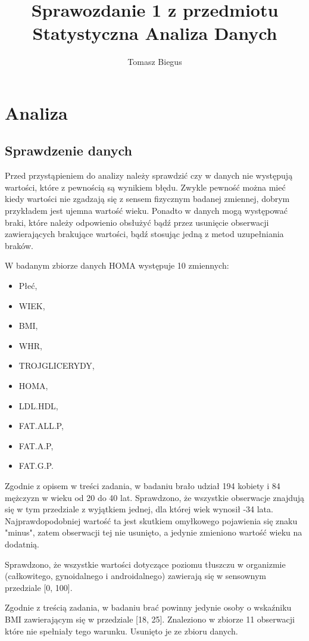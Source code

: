 \documentclass{article}
\author{Tomasz Biegus}
\title{Sprawozdanie 1 z przedmiotu Statystyczna Analiza Danych}
\begin{document}
\maketitle



\section{Analiza}
\subsection{Sprawdzenie danych}
Przed przystąpieniem do analizy należy sprawdzić czy w danych nie występują wartości, które z pewnością są wynikiem błędu. Zwykle pewność można mieć kiedy wartości nie zgadzają się z sensem fizycznym badanej zmiennej, dobrym przykładem jest ujemna wartość wieku. Ponadto w danych mogą występować braki, które należy odpowienio obsłużyć bądź przez usunięcie obserwacji zawierających brakujące wartości, bądź stosując jedną z metod uzupełniania braków.

W badanym zbiorze danych HOMA występuje 10 zmiennych: 
\begin{itemize}
\item Płeć, 
\item WIEK, 
\item BMI, 
\item WHR, 
\item TROJGLICERYDY, 
\item HOMA, 
\item LDL.HDL, 
\item FAT.ALL.P, 
\item FAT.A.P, 
\item FAT.G.P.
\end{itemize}


Zgodnie z opisem w treści zadania, w badaniu brało udział 194 kobiety i 84 mężczyzn w wieku od 20 do 40 lat. Sprawdzono, że wszystkie obserwacje znajdują się w tym przedziale z wyjątkiem jednej, dla której wiek wynosił -34 lata. Najprawdopodobniej wartość ta jest skutkiem omyłkowego pojawienia się znaku "minus", zatem obserwacji tej nie usunięto, a jedynie zmieniono wartość wieku na dodatnią.

Sprawdzono, że wszystkie wartości dotyczące poziomu tłuszczu w organizmie (całkowitego, gynoidalnego i androidalnego) zawierają się w sensownym przedziale [0, 100].

Zgodnie z treścią zadania, w badaniu brać powinny jedynie osoby o wskaźniku BMI zawierającym się w przedziale [18, 25]. Znaleziono w zbiorze 11 obserwacji które nie spełniały tego warunku. Usunięto je ze zbioru danych.
\end{document}
